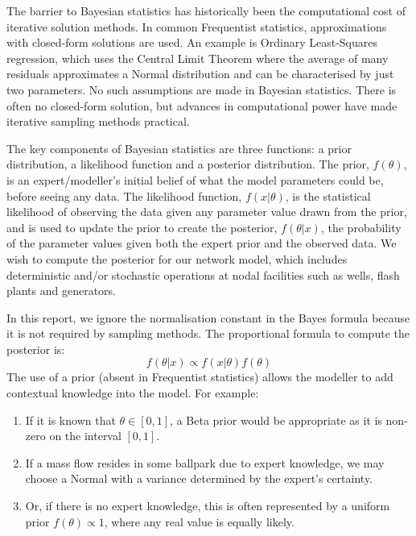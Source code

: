 \documentclass[a4paper, 12pt]{article}
\begin{document}
The barrier to Bayesian statistics has historically been the computational cost of iterative solution methods. In common Frequentist statistics, approximations with closed-form solutions are used. An example is Ordinary Least-Squares regression, which uses the Central Limit Theorem where the average of many residuals approximates a Normal distribution and can be characterised by just two parameters. No such assumptions are made in Bayesian statistics. There is often no closed-form solution, but advances in computational power have made iterative sampling methods practical.

The key components of Bayesian statistics are three functions: a prior distribution, a likelihood function and a posterior distribution. The prior, $f(\theta)$, is an expert/modeller's initial belief of what the model parameters could be, before seeing any data. The likelihood function, $f(x|\theta)$, is the statistical likelihood of observing the data given any parameter value drawn from the prior, and is used to update the prior to create the posterior, $f(\theta|x)$, the probability of the parameter values given both the expert prior and the observed data. We wish to compute the posterior for our network model, which includes deterministic and/or stochastic operations at nodal facilities such as wells, flash plants and generators.

In this report, we ignore the normalisation constant in the Bayes formula because it is not required by sampling methods. The proportional formula to compute the posterior is:
\begin{equation}
f(\theta|x) \propto f(x|\theta)f(\theta)
\end{equation}
The use of a prior (absent in Frequentist statistics) allows the modeller to add contextual knowledge into the model. For example:

\begin{enumerate}
\item If it is known that $\theta \in [0,1]$, a Beta prior would be appropriate as it is non-zero on the interval $[0, 1]$. 
\item If a mass flow resides in some ballpark due to expert knowledge, we may choose a Normal with a variance determined by the expert's certainty.
\item Or, if there is no expert knowledge, this is often represented by a uniform prior $f(\theta)\propto 1$, where any real value is equally likely.
\end{enumerate}
\end{document}
